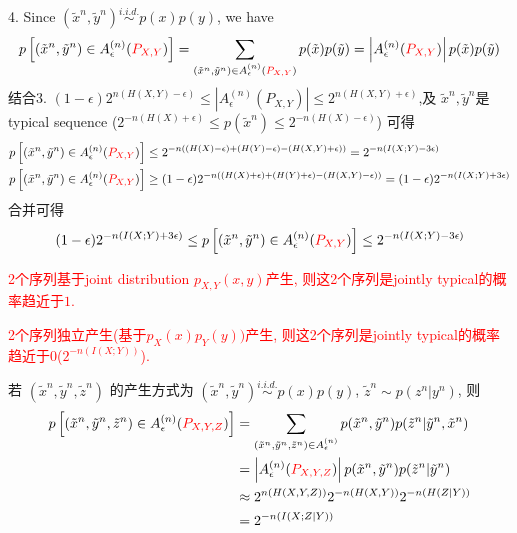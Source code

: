 4. Since $(\tilde{x}^n,\tilde{y}^n)\stackrel{i.i.d.}{\sim} p(x)p(y)$, we have
$$p\left[(\tilde{x}^n,\tilde{y}^n)\in A_{\epsilon}^{(n)}(\textcolor{red}{P_{X,Y}})\right] = \sum_{(\tilde{x}^n,\tilde{y}^n)\in A_{\epsilon}^{(n)}(\textcolor{red}{P_{X,Y}})}p(\tilde{x})p(\tilde{y}) = \left|A_{\epsilon}^{(n)}(\textcolor{red}{P_{X,Y}})\right|p(\tilde{x})p(\tilde{y})$$
结合3. $(1-\epsilon)2^{n\left(H(X,Y)-\epsilon\right)} \leq \left|A_{\epsilon}^{(n)}(P_{X,Y})\right| \leq 2^{n\left(H(X,Y)+\epsilon\right)}$,及 $\tilde{x}^n,\tilde{y}^n$是typical sequence ($2^{-n\left(H(X)+\epsilon\right)}\leq p(\tilde{x}^n)\leq 2^{-n\left(H(X)-\epsilon\right)}$) 可得
\begin{align*}
p\left[(\tilde{x}^n,\tilde{y}^n)\in A_{\epsilon}^{(n)}(\textcolor{red}{P_{X,Y}})\right] &\leq 2^{-n\left((H(X)-\epsilon)+(H(Y)-\epsilon)-(H(X,Y)+\epsilon)\right)} = 2^{-n\left(I(X;Y)-3\epsilon\right)} \\
p\left[(\tilde{x}^n,\tilde{y}^n)\in A_{\epsilon}^{(n)}(\textcolor{red}{P_{X,Y}})\right] &\geq (1-\epsilon)2^{-n\left((H(X)+\epsilon)+(H(Y)+\epsilon)-(H(X,Y)-\epsilon)\right)} = (1-\epsilon)2^{-n\left(I(X;Y)+3\epsilon\right)}
\end{align*}
合并可得
$$(1-\epsilon)2^{-n\left(I(X;Y)+3\epsilon\right)} \leq p\left[(\tilde{x}^n,\tilde{y}^n)\in A_{\epsilon}^{(n)}(\textcolor{red}{P_{X,Y}})\right] \leq 2^{-n\left(I(X;Y)-3\epsilon\right)}$$

\textcolor{red}{2个序列基于joint distribution $p_{X,Y}(x,y)$产生, 则这2个序列是jointly typical的概率趋近于$1$.}

\textcolor{red}{2个序列独立产生(基于$p_X(x)p_Y(y))$产生, 则这2个序列是jointly typical的概率趋近于$0$($2^{-n\left(I(X;Y)\right)}$).}

\begin{example}
若 $(\tilde{x}^n,\tilde{y}^n,\tilde{z}^n)$ 的产生方式为 $(\tilde{x}^n,\tilde{y}^n)\stackrel{i.i.d.}{\sim}p(x)p(y)$, $\tilde{z}^n\sim p(z^n|y^n)$, 则
\begin{align*}
p\left[(\tilde{x}^n,\tilde{y}^n,\tilde{z}^n)\in A_{\epsilon}^{(n)}(\textcolor{red}{P_{X,Y,Z}})\right] &= \sum_{(\tilde{x}^n,\tilde{y}^n,\tilde{z}^n)\in A_{\epsilon}^{(n)}}p(\tilde{x}^n,\tilde{y}^n)p(\tilde{z}^n|\tilde{y}^n,\tilde{x}^n) \\
&= \left|A_{\epsilon}^{(n)}(\textcolor{red}{P_{X,Y,Z}})\right| p(\tilde{x}^n,\tilde{y}^n)p(\tilde{z}^n|\tilde{y}^n) \\
&\approx 2^{n\left(H(X,Y,Z)\right)}2^{-n\left(H(X,Y)\right)}2^{-n\left(H(Z|Y)\right)} \\
&= 2^{-n\left(I(X;Z|Y)\right)}
\end{align*}
\end{example}

